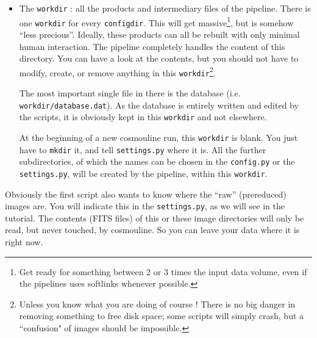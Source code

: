 \begin{itemize}
\item The \verb+workdir+ : all the products and intermediary files of the pipeline. There is one \verb+workdir+ for every \verb+configdir+. This will get massive\footnote{Get ready for something between 2 or 3 times the input data volume, even if the pipelines uses softlinks whenever possible.}, but is somehow ``less precious''. Ideally, these products can all be rebuilt with only minimal human interaction. The pipeline completely handles the content of this directory. You can have a look at the contents, but you should not have to modify, create, or remove anything in this  \verb+workdir+\footnote{Unless you know what you are doing of course ! There is no big danger in removing something to free disk space; some scripts will simply crash, but a ``confusion" of images should be impossible.}.

The most important single file in there is the database (i.e. \verb+workdir/database.dat+). As the database is entirely written and edited by the scripts, it is obviously kept in this \verb+workdir+ and not elsewhere.

At the beginning of a new cosmouline run, this \verb+workdir+ is blank. You just have to \verb+mkdir+ it, and tell \verb+settings.py+ where it is.
All the further subdirectories, of which the names can be chosen in the \verb+config.py+ or the \verb+settings.py+, will be created by the pipeline, within this \verb+workdir+.

\end{itemize}



Obviously the first script also wants to know where the ``raw'' (prereduced) images are. You will indicate this in the \verb+settings.py+, as we will see in the tutorial. The contents (FITS files) of this or these image directories will only be read, but never touched, by cosmouline. So you can leave your data where it is right now.




